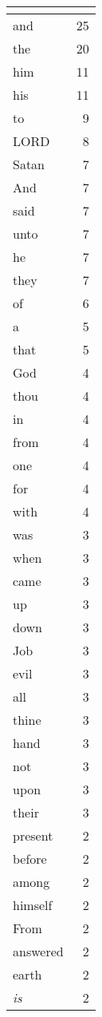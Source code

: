 \begin{center}
\begin{longtable}{l|r}
\hline \multicolumn{2}{c}{{ }} \\ \hline
\endfoot 
and & 25\\ \hline 
the & 20\\ \hline 
him & 11\\ \hline 
his & 11\\ \hline 
to & 9\\ \hline 
LORD & 8\\ \hline 
Satan & 7\\ \hline 
And & 7\\ \hline 
said & 7\\ \hline 
unto & 7\\ \hline 
he & 7\\ \hline 
they & 7\\ \hline 
of & 6\\ \hline 
a & 5\\ \hline 
that & 5\\ \hline 
God & 4\\ \hline 
thou & 4\\ \hline 
in & 4\\ \hline 
from & 4\\ \hline 
one & 4\\ \hline 
for & 4\\ \hline 
with & 4\\ \hline 
was & 3\\ \hline 
when & 3\\ \hline 
came & 3\\ \hline 
up & 3\\ \hline 
down & 3\\ \hline 
Job & 3\\ \hline 
evil & 3\\ \hline 
all & 3\\ \hline 
thine & 3\\ \hline 
hand & 3\\ \hline 
not & 3\\ \hline 
upon & 3\\ \hline 
their & 3\\ \hline 
present & 2\\ \hline 
before & 2\\ \hline 
among & 2\\ \hline 
himself & 2\\ \hline 
From & 2\\ \hline 
answered & 2\\ \hline 
earth & 2\\ \hline 
\emph{is} & 2\\ \hline 

\end{longtable}
\end{center}
